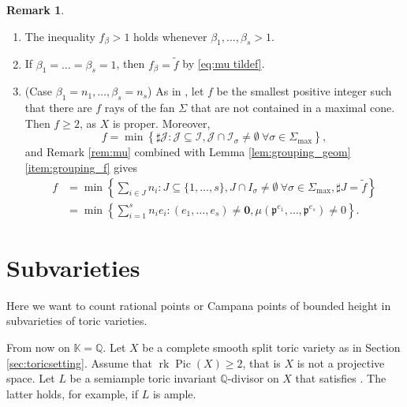 \documentclass[10pt, a4paper, reqno, english]{amsart}
\newcommand\QQ{\mathbb{Q}}
\newcommand{\KK}{\mathbb{K}} %
\DeclareMathOperator{\pic}{Pic} %
\DeclareMathOperator{\rk}{rk} %
\theoremstyle{definition}
\newtheorem{remark}[theorem]{Remark}
\numberwithin{theorem}{section}
\numberwithin{equation}{section}
\begin{document}
\begin{remark}
\begin{enumerate}[label=(\roman*), ref=(\roman*)]
\item
The inequality $f_\beta>1$ holds whenever $\beta_1,\dots,\beta_s>1$.
\item
If $\beta_1=\dots=\beta_s=1$, then $f_{\beta}=\tilde f$ by \eqref{eq:mu tildef}.
\item (Case $\beta_1=n_1,\dots,\beta_s=n_s$)
 As in \cite[Lemma 11.15(d)]{MR1679841}, let $f$ be the smallest positive integer such that there are $f$ rays of the fan $\Sigma$ that are not contained in a maximal cone. Then $f\geq 2$, as $X$ is proper. Moreover, $$f=\min \left \{\sharp\mathcal J:\mathcal J\subseteq\mathcal I, \mathcal J\cap\mathcal I_\sigma\neq\emptyset \ \forall\sigma\in\Sigma_{\max}\right \},$$
and Remark \ref{rem:mu} combined with Lemma \ref{lem:grouping_geom}\ref{item:grouping_f} gives
\begin{align*}
f&=\min\left \{\sum_{i\in J}n_i: J\subseteq\{1,\dots, s\}, J\cap I_\sigma\neq\emptyset \ \forall \sigma\in\Sigma_{\max}, \sharp J=\tilde f\right \}\\
 &=\min \left \{\sum_{i=1}^sn_ie_i: (e_1,\dots,e_s)\neq\mathbf 0, \mu(\mathfrak p^{e_1},\dots,\mathfrak p^{e_s})\neq0\right \}.
\end{align*}
\end{enumerate}
\end{remark}	

\section{Subvarieties}
\label{sec:subvarieties}

Here we want to count rational points or Campana points of bounded height in subvarieties of toric varieties.

From now on $\KK=\QQ$. Let $X$ be a complete smooth split toric variety as in Section \ref{sec:toricsetting}. Assume that $\rk\pic(X)\geq 2$, that is $X$ is not a projective space. Let $L$ be a semiample toric invariant $\QQ$-divisor on $X$ that satisfies \cite[Assumption 6.3]{hypmethod}. The latter holds, for example, if $L$ is ample. 
\end{document}
